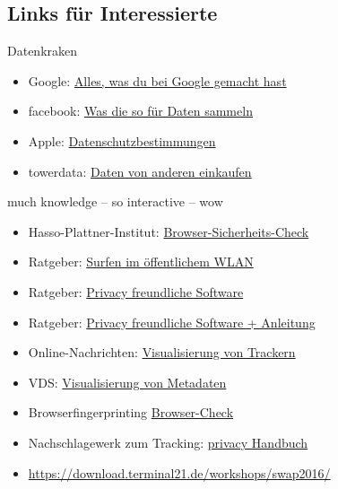 \documentclass[hyperref={colorlinks,linkcolor=white}, utf8]{beamer}
\begin{document}
	\subsection{Links für Interessierte}
	\begin{frame}{Datenkraken}
			\noindent
			\begin{itemize}
				\item Google: \href{https://myactivity.google.com/}{Alles, was du bei Google gemacht hast}
				\item facebook: \href{https://netzpolitik.org/2016/98-daten-die-facebook-ueber-dich-weiss-und-nutzt-um-werbung-auf-dich-zuzuschneiden/}{Was die so für Daten sammeln}
				\item Apple: \href{https://www.apple.com/privacy/privacy-policy/}{Datenschutzbestimmungen}
				\item towerdata: \href{http://intelligence.towerdata.com/pricing-append}{Daten von anderen einkaufen}
			\end{itemize}
	\end{frame}
	
		\begin{frame}{much knowledge -- so interactive -- wow}
			\noindent
			\begin{itemize}
				\item Hasso-Plattner-Institut: \href{https://sec.hpi.de/vulndb/sd_first/}{Browser-Sicherheits-Check}
				\item Ratgeber: 
				\href{https://www.mbem.nrw/unterwegs-im-oeffentlichen-wlan-aber-gut-geschuetzt}{Surfen im öffentlichem WLAN }
				\item Ratgeber: \href{https://prism-break.org/en/}{Privacy freundliche Software}
				\item Ratgeber: \href{(https://ssd.eff.org/)}{Privacy freundliche Software + Anleitung}
				\item Online-Nachrichten: \href{https://trackography.org/}{Visualisierung von Trackern}
				\item VDS: \href{http://www.zeit.de/datenschutz/malte-spitz-vorratsdaten }{Visualisierung von Metadaten}				
				\item Browserfingerprinting \href{https://panopticlick.eff.org}{Browser-Check}
				\item Nachschlagewerk zum Tracking: \href{https://privacy-handbuch.de/}{privacy Handbuch}
				\item \url{https://download.terminal21.de/workshops/swap2016/}
			\end{itemize}
		\end{frame}
	
	
	
\end{document}
